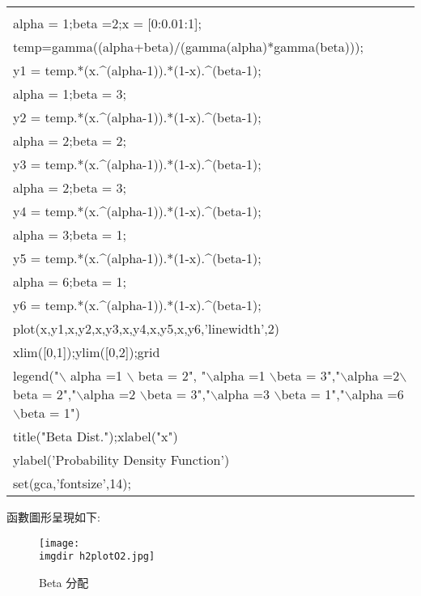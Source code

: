 		\begin{center}\colorbox{slight}{
				\begin{tabular}{p{}}
					\MJHmarker{\textbf{MATLAB語法 :}}\\					
					alpha = 1;beta =2;x = [0:0.01:1];\\		
					temp=gamma((alpha+beta)/(gamma(alpha)*gamma(beta)));\\
					y1 = temp.*(x.$\^$(alpha-1)).*(1-x).$\^$(beta-1);\\
					alpha = 1;beta = 3;\\					
					y2 = temp.*(x.$\^$(alpha-1)).*(1-x).$\^$(beta-1);\\
					alpha = 2;beta = 2;\\					
					y3 = temp.*(x.$\^$(alpha-1)).*(1-x).$\^$(beta-1);\\
					alpha = 2;beta = 3;\\					
					y4 = temp.*(x.$\^$(alpha-1)).*(1-x).$\^$(beta-1);\\
					alpha = 3;beta = 1;\\					
					y5 = temp.*(x.$\^$(alpha-1)).*(1-x).$\^$(beta-1);\\
					alpha = 6;beta = 1;\\					
					y6 = temp.*(x.$\^$(alpha-1)).*(1-x).$\^$(beta-1);\\
					plot(x,y1,x,y2,x,y3,x,y4,x,y5,x,y6,'linewidth',2)\\
					xlim([0,1]);ylim([0,2]);grid\\	
					legend("$\backslash$ alpha =1 $\backslash$ beta = 2", "$\backslash						$alpha =1 $\backslash$beta = 3","$\backslash$alpha =2$\backslash						$beta = 2","$\backslash$alpha =2 $\backslash$beta = 3","$								\backslash$alpha =3 $\backslash$beta = 1","$\backslash$alpha =6 						$\backslash$beta = 1")\\
					title("Beta Dist.");xlabel("x")\\					
					ylabel('Probability Density Function')\\
					set(gca,'fontsize',14);\\
				\end{tabular}
			}
			\end{center}	
		
		函數圖形呈現如下:
		\begin{figure}[H]	
		 	 \centering	 			 	 
   			 \texttt{[image: \\imgdir h2plotO2.jpg]} 
   			 \caption{Beta 分配} 	
   			 \label{h2plotO2}   			 		 
		\end{figure}		
